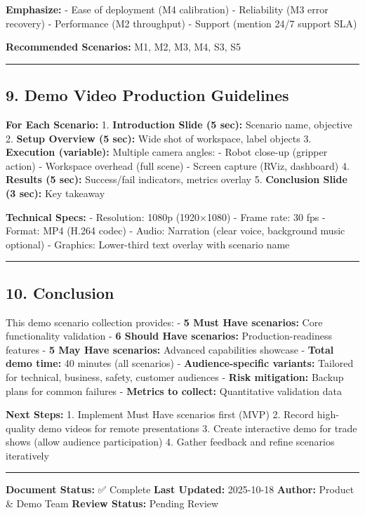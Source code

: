 \documentclass[
]{article}
\begin{document}
\textbf{Emphasize:} - Ease of deployment (M4 calibration) - Reliability
(M3 error recovery) - Performance (M2 throughput) - Support (mention
24/7 support SLA)

\textbf{Recommended Scenarios:} M1, M2, M3, M4, S3, S5

\begin{center}\rule{0.5\linewidth}{0.5pt}\end{center}

\hypertarget{demo-video-production-guidelines}{%
\subsection{9. Demo Video Production
Guidelines}\label{demo-video-production-guidelines}}

\textbf{For Each Scenario:} 1. \textbf{Introduction Slide (5 sec):}
Scenario name, objective 2. \textbf{Setup Overview (5 sec):} Wide shot
of workspace, label objects 3. \textbf{Execution (variable):} Multiple
camera angles: - Robot close-up (gripper action) - Workspace overhead
(full scene) - Screen capture (RViz, dashboard) 4. \textbf{Results (5
sec):} Success/fail indicators, metrics overlay 5. \textbf{Conclusion
Slide (3 sec):} Key takeaway

\textbf{Technical Specs:} - Resolution: 1080p (1920×1080) - Frame rate:
30 fps - Format: MP4 (H.264 codec) - Audio: Narration (clear voice,
background music optional) - Graphics: Lower-third text overlay with
scenario name

\begin{center}\rule{0.5\linewidth}{0.5pt}\end{center}

\hypertarget{conclusion}{%
\subsection{10. Conclusion}\label{conclusion}}

This demo scenario collection provides: - \textbf{5 Must Have
scenarios:} Core functionality validation - \textbf{6 Should Have
scenarios:} Production-readiness features - \textbf{5 May Have
scenarios:} Advanced capabilities showcase - \textbf{Total demo time:}
40 minutes (all scenarios) - \textbf{Audience-specific variants:}
Tailored for technical, business, safety, customer audiences -
\textbf{Risk mitigation:} Backup plans for common failures -
\textbf{Metrics to collect:} Quantitative validation data

\textbf{Next Steps:} 1. Implement Must Have scenarios first (MVP) 2.
Record high-quality demo videos for remote presentations 3. Create
interactive demo for trade shows (allow audience participation) 4.
Gather feedback and refine scenarios iteratively

\begin{center}\rule{0.5\linewidth}{0.5pt}\end{center}

\textbf{Document Status:} ✅ Complete \textbf{Last Updated:} 2025-10-18
\textbf{Author:} Product \& Demo Team \textbf{Review Status:} Pending
Review
\end{document}
